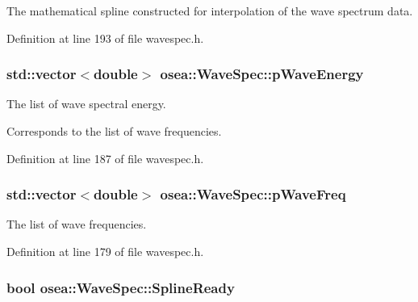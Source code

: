The mathematical spline constructed for interpolation of the wave spectrum data. 



Definition at line 193 of file wavespec.\-h.

\hypertarget{classosea_1_1_wave_spec_a9f53c79c4ca381d594f28d1e6356fc16}{
\subsubsection[{p\-Wave\-Energy}]{\setlength{\rightskip}{0pt plus 5cm}std\-::vector$<$double$>$ osea\-::\-Wave\-Spec\-::p\-Wave\-Energy\hspace{0.3cm}{\ttfamily [protected]}}}\label{classosea_1_1_wave_spec_a9f53c79c4ca381d594f28d1e6356fc16}


The list of wave spectral energy. 

Corresponds to the list of wave frequencies. 

Definition at line 187 of file wavespec.\-h.

\hypertarget{classosea_1_1_wave_spec_ab45dc3ff2434f811c9ac8be1db97e9ac}{
\subsubsection[{p\-Wave\-Freq}]{\setlength{\rightskip}{0pt plus 5cm}std\-::vector$<$double$>$ osea\-::\-Wave\-Spec\-::p\-Wave\-Freq\hspace{0.3cm}{\ttfamily [protected]}}}\label{classosea_1_1_wave_spec_ab45dc3ff2434f811c9ac8be1db97e9ac}
The list of wave frequencies. 

Definition at line 179 of file wavespec.\-h.

\hypertarget{classosea_1_1_wave_spec_a9e268505ee26a9c2b61f13976c52ff93}{
\subsubsection[{Spline\-Ready}]{\setlength{\rightskip}{0pt plus 5cm}bool osea\-::\-Wave\-Spec\-::\-Spline\-Ready\hspace{0.3cm}{\ttfamily [protected]}}}\label{classosea_1_1_wave_spec_a9e268505ee26a9c2b61f13976c52ff93}


